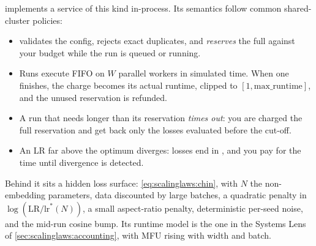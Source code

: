  implements a service of this kind in-process. Its
semantics follow common shared-cluster policies:
\begin{itemize}
\item {} validates the config, rejects exact duplicates,
      and \emph{reserves} the full  against your budget while the run
      is queued or running.
\item Runs execute FIFO on $W$ parallel workers in simulated time. When one finishes, the
      charge becomes its actual runtime, clipped to $[1, \text{max\_runtime}]$, and the
      unused reservation is refunded.
\item A run that needs longer than its reservation \emph{times out}: you are charged the full
      reservation and get back only the losses evaluated before the cut-off.
\item An LR far above the optimum diverges: losses end in , and you pay for the
      time until divergence is detected.
\end{itemize}
Behind it sits a hidden loss surface: \cref{eq:scalinglaws:chin}, with $N$ the non-embedding
parameters, data discounted by large batches, a quadratic penalty in $\log(\text{LR}/\text{lr}^*(N))$,
a small aspect-ratio penalty, deterministic per-seed noise, and the mid-run cosine bump. Its
runtime model is the one in the Systems Lens of \cref{sec:scalinglaws:accounting}, with MFU
rising with width and batch.

